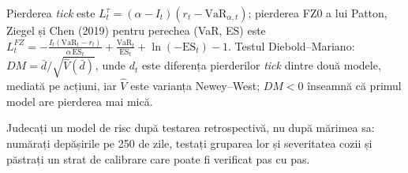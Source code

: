 {Pierderea \emph{tick} este $L^{\tau}_t=(\alpha-I_t)(r_t-\mathrm{VaR}_{\alpha,t})$; pierderea FZ0 a lui Patton, Ziegel și Chen (2019) pentru perechea (VaR, ES) este $L^{FZ}_t=-\frac{I_t(\mathrm{VaR}_t-r_t)}{\alpha\,\mathrm{ES}_t}+\frac{\mathrm{VaR}_t}{\mathrm{ES}_t}+\ln(-\mathrm{ES}_t)-1$.
Testul Diebold--Mariano: $DM=\bar d/\sqrt{\hat V(\bar d)}$, unde $d_t$ este diferența pierderilor \emph{tick} dintre două modele, mediată pe acțiuni, iar $\hat V$ este varianța Newey--West; $DM<0$ înseamnă că primul model are pierderea mai mică.}
\begin{decision}
%
{Judecați un model de risc după testarea retrospectivă, nu după mărimea sa: numărați depășirile pe 250 de zile, testați gruparea lor și severitatea cozii și păstrați un strat de calibrare care poate fi verificat pas cu pas.}
\end{decision}

